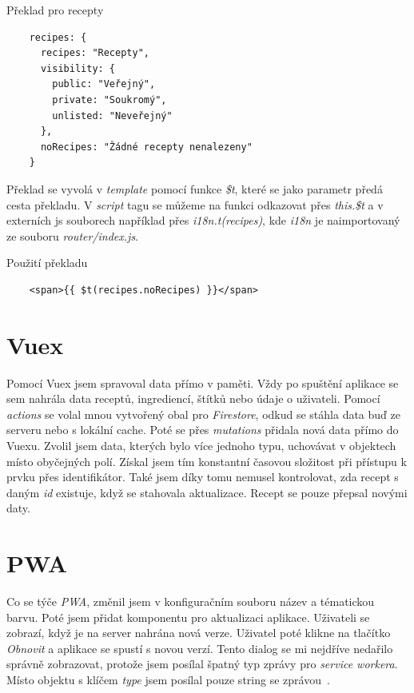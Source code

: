 \begin{listing}[h]
    \caption{Překlad pro recepty}
    \begin{verbatim}
    recipes: {
      recipes: "Recepty",
      visibility: {
        public: "Veřejný",
        private: "Soukromý",
        unlisted: "Neveřejný"
      },
      noRecipes: "Žádné recepty nenalezeny"
    }
    \end{verbatim}
\end{listing}

Překlad se vyvolá v \emph{template} pomocí funkce \emph{\$t}, které se jako parametr předá cesta překladu. V \emph{script}
tagu se můžeme na funkci odkazovat přes \emph{this.\$t} a v externích js souborech například přes \emph{i18n.t(recipes)}, kde
\emph{i18n} je naimportovaný ze souboru \emph{router/index.js}.

\begin{listing}[H]
    \caption{Použití překladu}
    \begin{verbatim}
    <span>{{ $t(recipes.noRecipes) }}</span>
    \end{verbatim}
\end{listing}

\section{Vuex}
Pomocí Vuex jsem spravoval data přímo v paměti. Vždy po spuštění aplikace se sem nahrála data receptů, ingrediencí, štítků
nebo údaje o uživateli. Pomocí \emph{actions} se volal mnou vytvořený obal pro \emph{Firestore}, odkud se stáhla data buď ze serveru
nebo s lokální cache. Poté se přes \emph{mutations} přidala nová data přímo do Vuexu. Zvolil jsem data, kterých bylo více jednoho typu,
uchovávat v objektech místo obyčejných polí. Získal jsem tím konstantní časovou složitost při přístupu k prvku přes identifikátor. Také
jsem díky tomu nemusel kontrolovat, zda recept s daným \emph{id} existuje, když se stahovala aktualizace. Recept se pouze přepsal novými
daty.

\section{PWA}
Co se týče \emph{PWA}, změnil jsem v konfiguračním souboru název a tématickou barvu. Poté jsem přidat komponentu pro aktualizaci aplikace.
Uživateli se zobrazí, když je na server nahrána nová verze. Uživatel poté klikne na tlačítko \emph{Obnovit} a aplikace se spustí s novou verzí.
Tento dialog se mi nejdříve nedařilo správně zobrazovat, protože jsem posílal špatný typ zprávy pro \emph{service workera}. Místo objektu s
klíčem \emph{type} jsem posílal pouze string se zprávou~\cite{PWAServiceWorker}.


